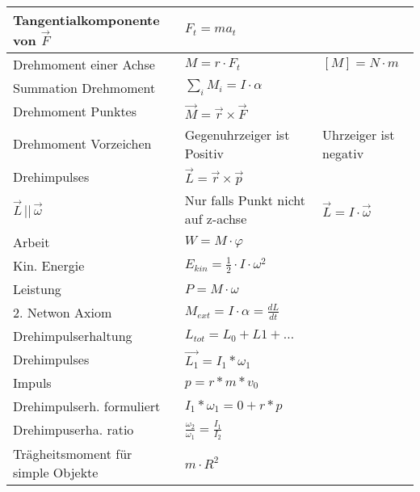 \begin{tabularx}{\columnwidth}{@{}XXX@{}}
	Tangentialkomponente von $\vec{F}$ & $F_t = ma_t$                                                                     \\ \hline
	Drehmoment einer Achse             & $M = r\cdot F_t$                              & $[M] = N\cdot m$                 \\ \hline
	Summation Drehmoment               & $\sum_{i} M_i = I\cdot\alpha$                                                    \\ \hline
	Drehmoment Punktes                 & $\vec{M} = \vec{r} \times \vec{F}$                                               \\ \hline
	Drehmoment Vorzeichen              & Gegenuhrzeiger ist Positiv                    & Uhrzeiger ist negativ            \\ \hline
	Drehimpulses                       & $\vec{L} = \vec{r} \times \vec{p}$                                               \\ \hline
	$\vec{L}\,||\,\vec{\omega}$        & Nur falls Punkt nicht auf z-achse             & $\vec{L} = I \cdot \vec{\omega}$ \\ \hline
	Arbeit                             & $W = M \cdot \varphi$                                                            \\ \hline
	Kin. Energie                       & $E_{kin} = \frac{1}{2}\cdot I \cdot \omega^2$                                    \\ \hline
	Leistung                           & $P = M \cdot \omega$                                                             \\ \hline
	2. Netwon Axiom                    & $M_{ext} = I \cdot \alpha = \frac{dL}{dt}$                                      \\ \hline
	Drehimpulserhaltung				   & $L_{tot} = L_0 + L1 + ...$ \\ \hline
	Drehimpulses                       & $\vec{L_1} = I_1*\omega_1$                                               \\ \hline
	Impuls							   & $p = r*m*v_0$ \\ \hline
	Drehimpulserh. formuliert		   & $I_1*\omega_1 = 0 + r*p$ \\ \hline
	Drehimpuserha. ratio 			   & $\frac{\omega_2}{\omega_1} = \frac{I_1}{I_2}$ \\ \hline
	Trägheitsmoment für simple Objekte & $m\cdot R^2$ \\ \hline
\end{tabularx}